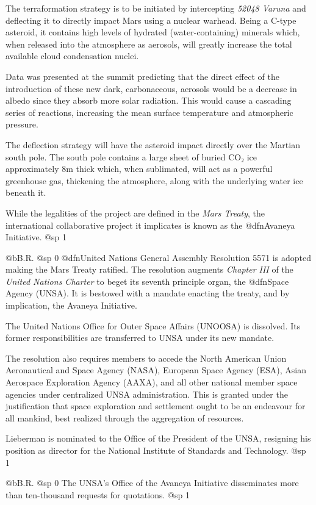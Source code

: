 The terraformation strategy is to be initiated by intercepting {\it 52048 Varuna} and deflecting it to directly impact Mars using a nuclear warhead. Being a C-type asteroid, it contains high levels of hydrated (water-containing) minerals which, when released into the atmosphere as aerosols, will greatly increase the total available cloud condensation nuclei. 

Data was presented at the summit predicting that the direct effect of the introduction of these new dark, carbonaceous, aerosols would be a decrease in albedo since they absorb more solar radiation. This would cause a cascading series of reactions, increasing the mean surface temperature and atmospheric pressure.

The deflection strategy will have the asteroid impact directly over the Martian south pole. The south pole contains a large sheet of buried CO₂ ice approximately 8m thick which, when sublimated, will act as a powerful greenhouse gas, thickening the atmosphere, along with the underlying water ice beneath it.

While the legalities of the project are defined in the {\it Mars Treaty}, the international collaborative project it implicates is known as the @dfn{Avaneya Initiative}.
@sp 1

@b{B.R.}
@sp 0
@dfn{United Nations General Assembly Resolution 5571} is adopted making the Mars Treaty ratified. The resolution augments {\it Chapter III} of the {\it United Nations Charter} to beget its seventh principle organ, the @dfn{Space Agency} (UNSA). It is bestowed with a mandate enacting the treaty, and by implication, the Avaneya Initiative.

The United Nations Office for Outer Space Affairs (UNOOSA) is dissolved. Its former responsibilities are transferred to UNSA under its new mandate.

The resolution also requires members to accede the North American Union Aeronautical and Space Agency (NASA), European Space Agency (ESA), Asian Aerospace Exploration Agency (AAXA), and all other national member space agencies under centralized UNSA administration. This is granted under the justification that space exploration and settlement ought to be an endeavour for all mankind, best realized through the aggregation of resources.

Lieberman is nominated to the Office of the President of the UNSA, resigning his position as director for the National Institute of Standards and Technology.
@sp 1

@b{B.R.}
@sp 0
The UNSA's Office of the Avaneya Initiative disseminates more than ten-thousand requests for quotations.
@sp 1

